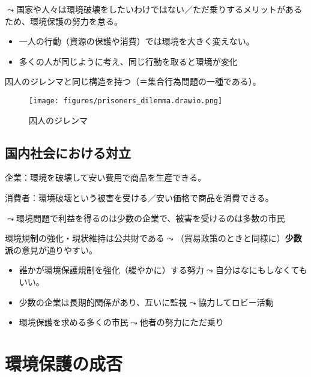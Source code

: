 \documentclass[
  xelatex,
  ja=standard]{bxjsarticle}
\providecommand{\tightlist}{%
  \setlength{\itemsep}{0pt}\setlength{\parskip}{0pt}}\usepackage{longtable,booktabs,array}
\begin{document}
\(\leadsto\)国家や人々は環境破壊をしたいわけではない／ただ乗りするメリットがあるため、環境保護の努力を怠る。

\begin{itemize}
\tightlist
\item
  一人の行動（資源の保護や消費）では環境を大きく変えない。
\item
  多くの人が同じように考え、同じ行動を取ると環境が変化
\end{itemize}

囚人のジレンマと同じ構造を持つ（＝集合行為問題の一種である）。

\begin{figure}[htpb]

{\centering \texttt{[image: figures/prisoners\_dilemma.drawio.png]}

}

\caption{囚人のジレンマ}

\end{figure}

\hypertarget{ux56fdux5185ux793eux4f1aux306bux304aux3051ux308bux5bfeux7acb}{%
\subsection{国内社会における対立}\label{ux56fdux5185ux793eux4f1aux306bux304aux3051ux308bux5bfeux7acb}}

企業：環境を破壊して安い費用で商品を生産できる。

消費者：環境破壊という被害を受ける／安い価格で商品を消費できる。

\(\leadsto\)環境問題で利益を得るのは少数の企業で、被害を受けるのは多数の市民

環境規制の強化・現状維持は公共財である\(\leadsto\)（貿易政策のときと同様に）\textbf{少数派}の意見が通りやすい。

\begin{itemize}
\tightlist
\item
  誰かが環境保護規制を強化（緩やかに）する努力\(\leadsto\)自分はなにもしなくてもいい。
\item
  少数の企業は長期的関係があり、互いに監視\(\leadsto\)協力してロビー活動
\item
  環境保護を求める多くの市民\(\leadsto\)他者の努力にただ乗り
\end{itemize}

\hypertarget{ux74b0ux5883ux4fddux8b77ux306eux6210ux5426}{%
\section{環境保護の成否}\label{ux74b0ux5883ux4fddux8b77ux306eux6210ux5426}}
\end{document}
